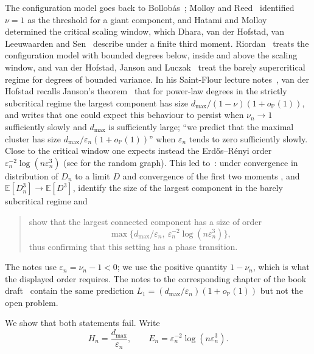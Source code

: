 \documentclass[11pt]{amsart}
\theoremstyle{definition}
\theoremstyle{remark}
\numberwithin{equation}{section}
\newcommand{\PP}{\mathbb P}
\newcommand{\E}{\mathbb E}
\newcommand{\eps}{\varepsilon}
\newcommand{\dmax}{d_{\max}}
\begin{document}
The configuration model goes back to Bollob\'as~\cite{Bol80}; Molloy and Reed~\cite{MR95} identified $\nu=1$ as the threshold for a giant component, and Hatami and Molloy~\cite{HM12} determined the critical scaling window, which Dhara, van der Hofstad, van Leeuwaarden and Sen~\cite{DHLS17} describe under a finite third moment. Riordan~\cite{Rio12} treats the configuration model with bounded degrees below, inside and above the scaling window, and van der Hofstad, Janson and Luczak~\cite{HJL19} treat the barely supercritical regime for degrees of bounded variance. In his Saint-Flour lecture notes~\cite{vdH17}, van der Hofstad recalls Janson's theorem~\cite{Jan08} that for power-law degrees in the strictly subcritical regime the largest component has size $\dmax/(1-\nu)(1+o_\PP(1))$, and writes that one could expect this behaviour to persist when $\nu_n\to1$ sufficiently slowly and $\dmax$ is sufficiently large; ``we predict that the maximal cluster has size $\dmax/\eps_n(1+o_\PP(1))$'' when $\eps_n$ tends to zero sufficiently slowly. Close to the critical window one expects instead the Erd\H{o}s--R\'enyi order $\eps_n^{-2}\log(n\eps_n^3)$ (see \cite{Luc90} for the random graph). This led to~\cite[Open Problem~4.13]{vdH17}: under convergence in distribution of $D_n$ to a limit $D$ and convergence of the first two moments \cite[Condition~1.6(a)--(c)]{vdH17}, and $\E[D_n^3]\to\E[D^3]$, identify the size of the largest component in the barely subcritical regime and
\begin{quote}
show that the largest connected component has a size of order
\[
\max\{\dmax/\eps_n,\ \eps_n^{-2}\log(n\eps_n^3)\},
\]
thus confirming that this setting has a phase transition.
\end{quote}
The notes use $\eps_n=\nu_n-1<0$; we use the positive quantity $1-\nu_n$, which is what the displayed order requires. The notes to the corresponding chapter of the book draft~\cite{vdH26} contain the same prediction $L_1=(\dmax/\eps_n)(1+o_\PP(1))$ but not the open problem.

We show that both statements fail. Write
\[
H_n=\frac{\dmax}{\eps_n},\qquad E_n=\eps_n^{-2}\log(n\eps_n^3).
\]
\end{document}
